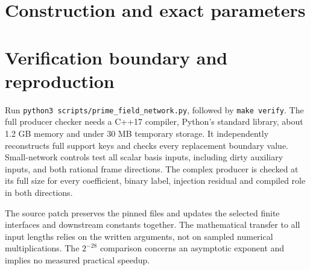 \documentclass[11pt]{article}
\begin{document}
\section{Construction and exact parameters}


\section{Verification boundary and reproduction}
Run \texttt{python3 scripts/prime\_field\_network.py}, followed by
\texttt{make verify}. The full producer checker needs a C++17 compiler,
Python's standard library, about 1.2 GB memory and under 30 MB temporary
storage. It independently reconstructs full support keys and checks every
replacement boundary value. Small-network controls test all scalar basis
inputs, including dirty auxiliary inputs, and both rational frame directions.
The complex producer is checked at its full size for every coefficient,
binary label, injection residual and compiled role in both directions.

The source patch preserves the pinned files and updates the selected finite
interfaces and downstream constants together. The mathematical transfer to
all input lengths relies on the written arguments, not on sampled numerical
multiplications. The $2^{-28}$ comparison concerns an asymptotic exponent
and implies no measured practical speedup.
\end{document}
